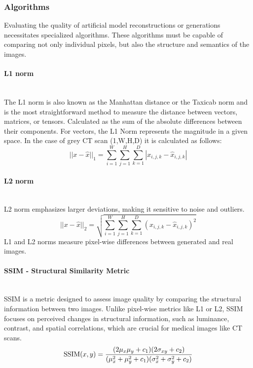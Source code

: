 \subsubsection{Algorithms}
Evaluating the quality of artificial model reconstructions or generations necessitates specialized algorithms. These algorithms must be capable of comparing not only individual pixels, but also the structure and semantics of the images.
\paragraph{L1 norm}\mbox{}\\
\indent The L1 norm is also known as the Manhattan distance or the Taxicab norm and is the most straightforward method to measure the distance between vectors, matrices, or tensors. Calculated as the sum of the absolute differences between their components. 
For vectors, the L1 Norm represents the magnitude in a given space. 
In the case of grey CT scan (1,W,H,D) it is calculated as follows:
\begin{equation}
||x-\hat{x}||_1 = \sum_{i=1}^{W} \sum_{j=1}^{H} \sum_{k=1}^{D} |x_{i,j,k}-\hat{x}_{i,j,k}|
\label{norm-l1}
\end{equation}

\paragraph{L2 norm}\mbox{}\\
\indent L2 norm emphasizes larger deviations, making it sensitive to noise and outliers.
\begin{equation}
||x-\hat{x}||_2 = \sqrt{\sum_{i=1}^{W} \sum_{j=1}^{H} \sum_{k=1}^{D} {(x_{i,j,k}-\hat{x}_{i,j,k})^2}}
\label{norm-l2}
\end{equation}
L1 and L2 norms measure pixel-wise differences between generated and real images.
\paragraph{SSIM - Structural Similarity Metric}\mbox{}\\
\indent SSIM is a metric designed to assess image quality by comparing the structural information between two images. Unlike pixel-wise metrics like L1 or L2, SSIM focuses on perceived changes in structural information, such as luminance, contrast, and spatial correlations, which are crucial for medical images like CT scans.
\begin{equation}
    \hbox{SSIM}(x,y) = \frac{(2\mu_x\mu_y + c_1)(2\sigma_{xy} + c_2)}{(\mu_x^2 + \mu_y^2 + c_1)(\sigma_x^2 + \sigma_y^2 + c_2)}
\end{equation}

